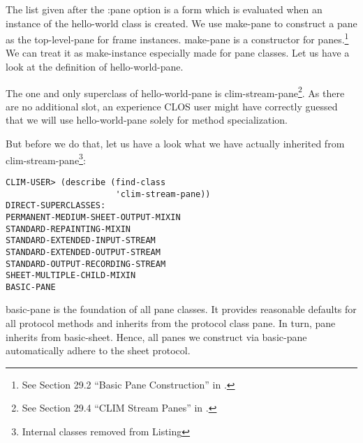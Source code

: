 \documentclass[twocolumn,a4paper]{article}
\newcommand {\concept} [1] {{\sl #1}\index{#1}}
\newcommand {\code}[1]{{\sffamily #1}}
\let\class\code
\let\method\code
\let\keyword\code
\begin{document}
The list given after the \keyword{:pane} option is a form which is evaluated when an instance of the \class{hello-world} class is created. We use \method{make-pane} to construct a pane as the top-level-pane for frame instances. \method{make-pane} is a constructor for panes.\footnote{See Section 29.2 ``Basic Pane Construction'' in \cite{clim-spec}.} We can treat it as \code{make-instance} especially made for pane classes. 
 Let us have a look at the definition of \class{hello-world-pane}.

\lstset{style=inlinestyle}

The one and only superclass of \class{hello-world-pane} is \class{clim-stream-pane}\footnote{See Section 29.4 ``CLIM Stream Panes'' in \cite{clim-spec}.}. As there are no additional slot, an experience CLOS user might have correctly guessed that we will use \class{hello-world-pane} solely for method specialization.

But before we do that, let us have a look what we have actually inherited from \class{clim-stream-pane}\footnote{Internal classes removed from Listing}:

\pagebreak %
\lstset{style=inlinestyle}
\begin{lstlisting}
CLIM-USER> (describe (find-class 
                      'clim-stream-pane))
DIRECT-SUPERCLASSES: 
PERMANENT-MEDIUM-SHEET-OUTPUT-MIXIN
STANDARD-REPAINTING-MIXIN
STANDARD-EXTENDED-INPUT-STREAM
STANDARD-EXTENDED-OUTPUT-STREAM
STANDARD-OUTPUT-RECORDING-STREAM
SHEET-MULTIPLE-CHILD-MIXIN
BASIC-PANE
\end{lstlisting}

\class{basic-pane} is the foundation of all pane classes. It provides reasonable defaults for all protocol methods and inherits from the protocol class \class{pane}. In turn, \class{pane} inherits from \class{basic-sheet}. Hence, all panes we construct via \class{basic-pane} automatically adhere to the sheet protocol.


\end{document}
